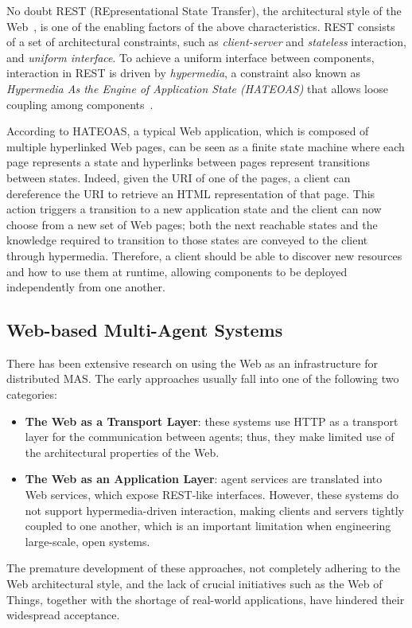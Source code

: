 No doubt REST (REpresentational State Transfer), the architectural style of the Web~\cite{fielding2000}, is one of the enabling factors of the above characteristics.
REST consists of a set of architectural constraints, such as \textit{client-server} and \textit{stateless} interaction, and \textit{uniform interface}.
To achieve a uniform interface between components, interaction in REST is driven by \textit{hypermedia}, a constraint also known as \textit{Hypermedia As the Engine of Application State (HATEOAS)} that allows loose coupling among components~\cite{Varanasi2015}.

According to HATEOAS, a typical Web application, which is composed of multiple hyperlinked Web pages, can be seen as a finite state machine where each page represents a state and hyperlinks between pages represent transitions between states.
Indeed, given the URI of one of the pages, a client can dereference the URI to retrieve an HTML representation of that page.
This action triggers a transition to a new application state and the client can now choose from a new set of Web pages; both the next reachable states and the knowledge required to transition to those states are conveyed to the client through hypermedia.
Therefore, a client should be able to discover new resources and how to use them at runtime, allowing components to be deployed independently from one another.

\subsection{Web-based Multi-Agent Systems}
There has been extensive research on using the Web as an infrastructure for distributed MAS.
The early approaches usually fall into one of the following two categories:
\begin{itemize}
    \item \textbf{The Web as a Transport Layer}: these systems use HTTP as a transport layer for the communication between agents; thus, they make limited use of the architectural properties of the Web.
    \item \textbf{The Web as an Application Layer}: agent services are translated into Web services, which expose REST-like interfaces.
    However, these systems do not support hypermedia-driven interaction, making clients and servers tightly coupled to one another, which is an important limitation when engineering large-scale, open systems.
\end{itemize}

The premature development of these approaches, not completely adhering to the Web architectural style, and the lack of crucial initiatives such as the Web of Things, together with the shortage of real-world applications, have hindered their widespread acceptance.

